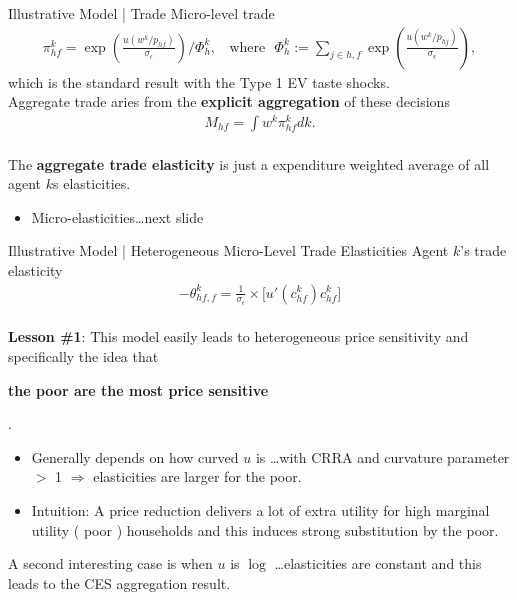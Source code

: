 \documentclass[9pt,pdftex,aspectratio=1610]{beamer}
\theoremstyle{definition}
\begin{document}

\begin{frame}[t]{Illustrative Model | Trade}
\smallskip
Micro-level trade
\begin{align*}
\pi_{hf}^k = \exp \left( \frac{ u( w^k / p_{hf} ) }{\sigma_{\epsilon}} \right) \Bigg / \Phi_{h}^k, \ \ \ \ \mbox{where} \ \ \ \Phi_{h}^k := \sum_{j\in {h,f}} \exp \left( \frac{ u( w^k / p_{hj} )  }{\sigma_{\epsilon}} \right),
\end{align*}
which is the standard result with the Type 1 EV taste shocks.\\
\bigskip
\medskip
Aggregate trade aries from the \textbf{explicit aggregation} of these decisions
\begin{align*}
M_{hf} = \int w^k \pi_{hf}^k dk.
\end{align*}\\
\bigskip
The \textbf{aggregate trade elasticity} is just a expenditure weighted average of all agent $k$s elasticities.
\begin{itemize}
\smallskip
\item Micro-elasticities\ldots next slide
\end{itemize}
\end{frame}


\begin{frame}[t]{Illustrative Model | Heterogeneous Micro-Level Trade Elasticities}
\smallskip
Agent $k$'s trade elasticity
\begin{align*}
-\theta_{hf,f}^k = \frac{1}{\sigma_{\epsilon}} \times \bigg[ u'( c_{hf}^k )c_{hf}^k \bigg]
\end{align*}\\
\bigskip
\textbf{Lesson \#1}: This model easily leads to heterogeneous price sensitivity and specifically the idea that \begin{alert}{\textbf{the poor are the most price sensitive}}\end{alert}.
\begin{itemize}
\smallskip
\item Generally depends on how curved $u$ is \ldots with CRRA and curvature parameter $>$ 1 $\Rightarrow$ elasticities are larger for the poor.
\smallskip
\item Intuition: A price reduction delivers a lot of extra utility for high marginal utility ( poor ) households and this induces strong substitution by the poor.
\end{itemize}
\bigskip
A second interesting case is when $u$ is $\log$ \ldots elasticities are constant and this leads to the {\small \citet{anderson1987ces}} CES aggregation result.
\end{frame}
\end{document}
